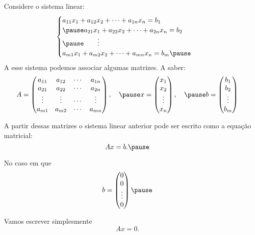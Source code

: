\documentclass{beamer}
\begin{document}
    \begin{frame}
        Considere o sistema linear: \pause
        \begin{equation}
	    \begin{cases}
                a_{11}x_1 + a_{12}x_2 + \cdots + a_{1n}x_n = b_1\\\pause
                a_{21}x_1 + a_{22}x_2 + \cdots + a_{2n}x_n = b_2\\\pause
                \qquad \vdots\\
                a_{m1}x_1 + a_{m2}x_2 + \cdots + a_{mn}x_n = b_m\pause
            \end{cases}
        \end{equation}
        A esse sistema podemos associar algumas matrizes. \pause A saber:
        \[
            A = \begin{pmatrix}
                a_{11} & a_{12} & \cdots & a_{1n}\\
                a_{21} & a_{22} & \cdots & a_{2n}\\
                \vdots & \vdots & \cdots & \vdots\\
                a_{m1} & a_{m2} & \cdots & a_{mn}
            \end{pmatrix}, \quad\pause
            x = \begin{pmatrix}
                x_1\\
                x_2\\
                \vdots\\
                x_n
            \end{pmatrix},\quad \pause
            b = \begin{pmatrix}
                b_1\\
                b_2\\
                \vdots\\
                b_m
            \end{pmatrix}
        \]
    \end{frame}

    \begin{frame}
        A partir dessas matrizes o sistema linear anterior pode ser escrito como a equação matricial:\pause
        \[
            Ax = b.\pause
        \]

        No caso em que
        \[
            b = \begin{pmatrix}
                0\\0\\\vdots\\0
            \end{pmatrix}\pause
        \]

        Vamos escrever simplesmente
        \[
            Ax = 0.
        \]
    \end{frame}
\end{document}
